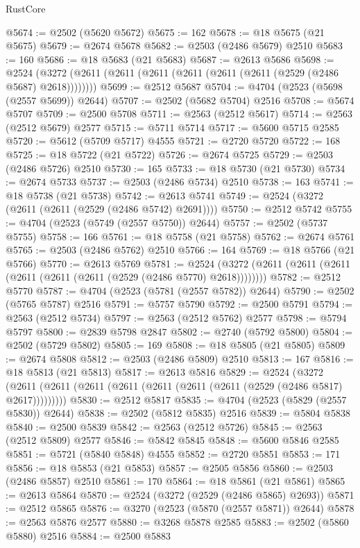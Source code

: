 \begin{lexlean}{RustCore}
\begin{coremodule}
@5674 := @2502 (@5620 @5672)
@5675 := 162
@5678 := @18 @5675 (@21 @5675)
@5679 := @2674 @5678
@5682 := @2503 (@2486 @5679) @2510
@5683 := 160
@5686 := @18 @5683 (@21 @5683)
@5687 := @2613 @5686
@5698 := @2524 (@3272 (@2611 (@2611 (@2611 (@2611 (@2611 (@2611 (@2529 (@2486 @5687) @2618))))))))
@5699 := @2512 @5687
@5704 := @4704 (@2523 (@5698 (@2557 @5699)) @2644)
@5707 := @2502 (@5682 @5704) @2516
@5708 := @5674 @5707
@5709 := @2500 @5708
@5711 := @2563 (@2512 @5617)
@5714 := @2563 (@2512 @5679) @2577
@5715 := @5711 @5714
@5717 := @5600 @5715 @2585
@5720 := @5612 (@5709 @5717) @4555
@5721 := @2720 @5720
@5722 := 168
@5725 := @18 @5722 (@21 @5722)
@5726 := @2674 @5725
@5729 := @2503 (@2486 @5726) @2510
@5730 := 165
@5733 := @18 @5730 (@21 @5730)
@5734 := @2674 @5733
@5737 := @2503 (@2486 @5734) @2510
@5738 := 163
@5741 := @18 @5738 (@21 @5738)
@5742 := @2613 @5741
@5749 := @2524 (@3272 (@2611 (@2611 (@2529 (@2486 @5742) @2691))))
@5750 := @2512 @5742
@5755 := @4704 (@2523 (@5749 (@2557 @5750)) @2644)
@5757 := @2502 (@5737 @5755)
@5758 := 166
@5761 := @18 @5758 (@21 @5758)
@5762 := @2674 @5761
@5765 := @2503 (@2486 @5762) @2510
@5766 := 164
@5769 := @18 @5766 (@21 @5766)
@5770 := @2613 @5769
@5781 := @2524 (@3272 (@2611 (@2611 (@2611 (@2611 (@2611 (@2611 (@2529 (@2486 @5770) @2618))))))))
@5782 := @2512 @5770
@5787 := @4704 (@2523 (@5781 (@2557 @5782)) @2644)
@5790 := @2502 (@5765 @5787) @2516
@5791 := @5757 @5790
@5792 := @2500 @5791
@5794 := @2563 (@2512 @5734)
@5797 := @2563 (@2512 @5762) @2577
@5798 := @5794 @5797
@5800 := @2839 @5798 @2847
@5802 := @2740 (@5792 @5800)
@5804 := @2502 (@5729 @5802)
@5805 := 169
@5808 := @18 @5805 (@21 @5805)
@5809 := @2674 @5808
@5812 := @2503 (@2486 @5809) @2510
@5813 := 167
@5816 := @18 @5813 (@21 @5813)
@5817 := @2613 @5816
@5829 := @2524
    (@3272 (@2611 (@2611 (@2611 (@2611 (@2611 (@2611 (@2611 (@2529 (@2486 @5817) @2617)))))))))
@5830 := @2512 @5817
@5835 := @4704 (@2523 (@5829 (@2557 @5830)) @2644)
@5838 := @2502 (@5812 @5835) @2516
@5839 := @5804 @5838
@5840 := @2500 @5839
@5842 := @2563 (@2512 @5726)
@5845 := @2563 (@2512 @5809) @2577
@5846 := @5842 @5845
@5848 := @5600 @5846 @2585
@5851 := @5721 (@5840 @5848) @4555
@5852 := @2720 @5851
@5853 := 171
@5856 := @18 @5853 (@21 @5853)
@5857 := @2505 @5856
@5860 := @2503 (@2486 @5857) @2510
@5861 := 170
@5864 := @18 @5861 (@21 @5861)
@5865 := @2613 @5864
@5870 := @2524 (@3272 (@2529 (@2486 @5865) @2693))
@5871 := @2512 @5865
@5876 := @3270 (@2523 (@5870 (@2557 @5871)) @2644)
@5878 := @2563 @5876 @2577
@5880 := @3268 @5878 @2585
@5883 := @2502 (@5860 @5880) @2516
@5884 := @2500 @5883

\end{coremodule}
\end{lexlean}
